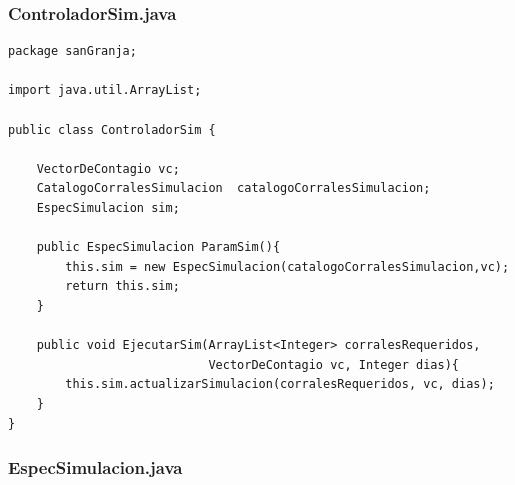 \documentclass[a4paper]{article}
\begin{document}
\subsubsection{ControladorSim.java}

\begin{lstlisting}
package sanGranja;

import java.util.ArrayList;

public class ControladorSim {

	VectorDeContagio vc;
	CatalogoCorralesSimulacion  catalogoCorralesSimulacion;
	EspecSimulacion sim;	

	public EspecSimulacion ParamSim(){
		this.sim = new EspecSimulacion(catalogoCorralesSimulacion,vc);
		return this.sim;
	}
	
	public void EjecutarSim(ArrayList<Integer> corralesRequeridos,
							VectorDeContagio vc, Integer dias){
		this.sim.actualizarSimulacion(corralesRequeridos, vc, dias);
	}
}
\end{lstlisting}

\subsubsection{EspecSimulacion.java}
\end{document}
